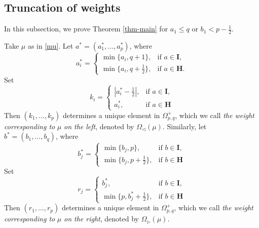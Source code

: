 \documentclass[11pt]{amsart}
\theoremstyle{plain}
\theoremstyle{definition}
\begin{document}
\subsection{Truncation of weights}
In this subsection, we prove Theorem \ref{thm-main} for $a_1\le q$ or $b_1<p-\frac{1}{2}$.

	Take $\mu$ as in \eqref{mu}. Let $a^*=(a_1^*,\dots, a_p^*)$, where
\[a_i^*=\left\{
\begin{array}{ll}
	\min\{a_i, q+1\}, &\mbox{if $a\in\textbf{I}$},\\
	\min\{a_i, q+\frac{1}{2}\}, & \mbox{if $a\in\textbf{H}$}.
\end{array}
\right.\]
Set
\[k_i=\left\{
\begin{array}{ll}
	|a_i^*-\frac{1}{2}|, & \mbox{if $a\in\textbf{I}$},\\
	a_i^*, & \mbox{if $a\in\textbf{H}$}
\end{array}
\right.\]
Then $(k_1,\dots,k_p)$ determines a unique element in $\Omega_{p,q}^+$, which we call \emph{the weight corresponding to} $\mu$ \emph{on the left}, denoted by $\Omega_{\lhd}(\mu)$. Similarly, let $b^*=(b_1,\dots,b_q)$, where
\[b_j^*=\left\{
\begin{array}{ll}
	\min\{b_j, p\}, & \mbox{if $b\in\textbf{I}$},\\
	\min\{b_j, p+\frac{1}{2}\}, & \mbox{if $b\in\textbf{H}$}
\end{array}
\right.\]
Set
\[r_j=\left\{
\begin{array}{ll}
	b_j^*, & \mbox{if $b\in\textbf{I}$},\\
	\min\{p,b_j^*+\frac{1}{2}\}, & \mbox{if $b\in\textbf{H}$}
\end{array}
\right.\]
Then $(r_1,\dots,r_p)$ determines a unique element in $\Omega_{p,q}^+$, which we call \emph{the weight corresponding to} $\mu$ \emph{on the right}, denoted by $\Omega_{\rhd}(\mu)$.
\end{document}
